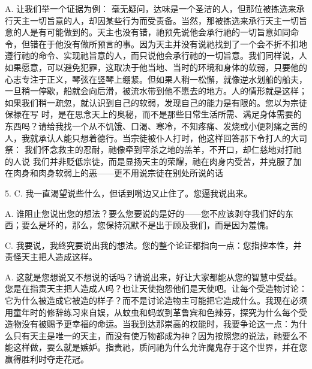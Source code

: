 A. 让我们举一个证据为例： 毫无疑问，达味是一个圣洁的人，但那位被拣选来承行天主一切旨意的人，却因某些行为而受责备。当然，那被拣选来承行天主一切旨意的人是有可能做到的。天主也没有错，祂预先说他会承行祂的一切旨意如同命令，但错在于他没有做所预言的事。因为天主并没有说祂找到了一个会不折不扣地遵行祂的命令、实现祂旨意的人，而只说他会承行祂的一切旨意。我们同样说，人如果愿意，可以避免犯罪，这取决于他当地、当时的环境和身体的软弱，只要他的心志专注于正义，琴弦在竖琴上绷紧。但如果人稍一松懈，就像逆水划船的船夫，一旦稍一停歇，船就会向后滑，被流水带到他不愿去的地方。人的情形就是这样；如果我们稍一疏忽，就认识到自己的软弱，发现自己的能力是有限的。您以为宗徒保禄在写   时，是在思念天上的奥秘，而不是那些日常生活所需、满足身体需要的东西吗？请给我找一个从不饥饿、口渴、寒冷，不知疼痛、发烧或小便刺痛之苦的人，我就承认人能只想着德行。当宗徒被仆人打时，他这样回答那下令打人的大司祭： 我们怀念救主的忍耐，祂像牵到宰杀之地的羔羊，不开口，却仁慈地对打祂的人说 我们并非贬低宗徒，而是显扬天主的荣耀，祂在肉身内受苦，并克服了加在肉身和肉身软弱上的恶——更不用说宗徒在别处所说的话\par

5. C. 我一直渴望说些什么，但话到嘴边又止住了。您逼我说出来。\par

A. 谁阻止您说出您的想法？要么您要说的是好的——您不应该剥夺我们好的东西；要么是坏的，那么，您保持沉默不是出于顾及我们，而是因为羞愧。\par

C. 我要说，我终究要说出我的想法。您的整个论证都指向一点：您指控本性，并责怪天主把人造成这样。\par

A. 这就是您想说又不想说的话吗？请说出来，好让大家都能从您的智慧中受益。您是在指责天主把人造成人吗？也让天使抱怨他们是天使吧。让每个受造物讨论：它为什么被造成它被造的样子？而不是讨论造物主可能把它造成什么。我现在必须用童年时的修辞练习来自娱，从蚊虫和蚂蚁到革鲁宾和色辣芬，探究为什么每个受造物没有被赐予更幸福的命运。当我到达那崇高的权能时，我要争论这一点：为什么只有天主是唯一的天主，而没有使万物都成为神？因为按照您的说法，祂要么不能这样做，要么就是嫉妒。指责祂，质问祂为什么允许魔鬼存于这个世界，并在您赢得胜利时夺走花冠。\par

